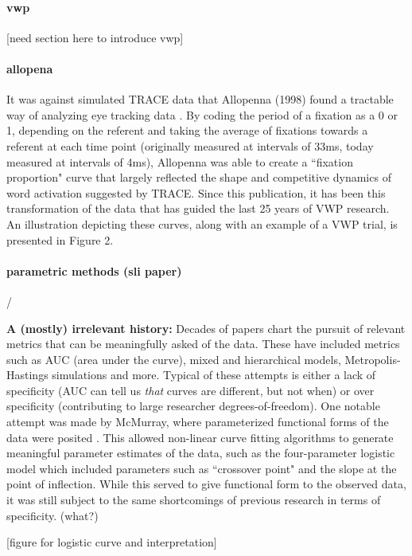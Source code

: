 \documentclass{article}
\begin{document}
\paragraph{vwp} [need section here to introduce vwp]

\paragraph{allopena} It was against simulated TRACE data that Allopenna (1998) found a tractable way of analyzing eye tracking data \cite{allopenna1998tracking}. By coding the period of a fixation as a 0 or 1, depending on the referent and taking the average of fixations towards a referent at each time point (originally measured at intervals of 33ms, today  measured at intervals of 4ms), Allopenna was able to create a ``fixation proportion" curve that largely reflected the shape and competitive dynamics of word activation suggested by TRACE. Since this publication, it has been this transformation of the data that has guided the last 25 years of VWP research. An illustration depicting these curves, along with an example of a VWP trial, is presented in Figure 2.

\paragraph{parametric methods (sli paper)}/



\textbf{A (mostly) irrelevant history: } Decades of papers chart the pursuit of relevant metrics that can be meaningfully asked of the data. These have included metrics such as AUC (area under the curve), mixed and hierarchical models, Metropolis-Hastings simulations and more. Typical of these attempts is either a lack of specificity (AUC can tell us \textit{that} curves are different, but not when) or over specificity (contributing to large researcher degrees-of-freedom). One notable attempt was made by McMurray, where parameterized functional forms of the data were posited \cite{mcmurray2010individual}. This allowed non-linear curve fitting algorithms to generate meaningful parameter estimates of the data, such as the four-parameter logistic model which included parameters such as ``crossover point" and the slope at the point of inflection. While this served to give functional form to the observed data, it was still subject to the same shortcomings of previous research in terms of specificity. (what?)

[figure for logistic curve and interpretation]
\end{document}

